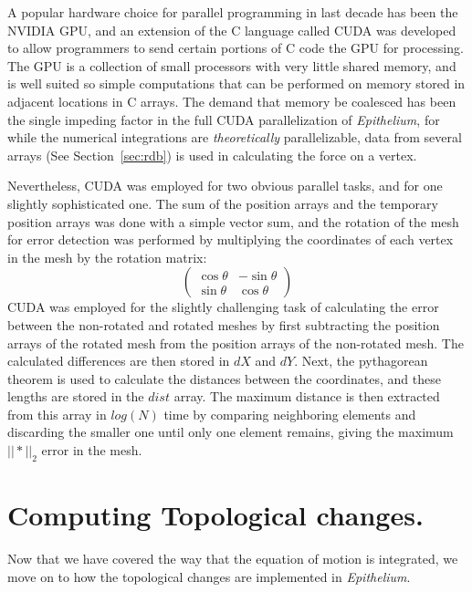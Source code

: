 A popular hardware choice for parallel programming in last decade has been the NVIDIA GPU, and an extension of the C language called CUDA was developed to allow programmers to send certain portions of C code the GPU for processing. The GPU is a collection of small processors with very little shared memory, and is well suited so simple computations that can be performed on memory stored in adjacent locations in C arrays. The demand that memory be coalesced has been the single impeding factor in the full CUDA parallelization of \emph{Epithelium}, for while the numerical integrations are \emph{theoretically} parallelizable, data from several arrays (See Section~\ref{sec:rdb}) is used in calculating the force on a vertex.

Nevertheless, CUDA was employed for two obvious parallel tasks, and for one slightly sophisticated one. The sum of the position arrays and the temporary position arrays was done with a simple vector sum, and the rotation of the mesh for error detection was performed by multiplying the coordinates of each vertex in the mesh by the rotation matrix:
\[ \left( \begin{array}{cc}
\cos\theta & -\sin\theta \\
\sin\theta & \cos\theta 
\end{array} \right)\] 
CUDA was employed for the slightly challenging task of calculating the error between the non-rotated and rotated meshes by first subtracting the position arrays of the rotated mesh from the position arrays of the non-rotated mesh. The calculated differences are then stored in $dX$ and $dY$. Next, the pythagorean theorem is used to calculate the distances between the coordinates, and these lengths are stored in the $dist$ array. The maximum distance is then extracted from this array in $log(N)$ time by comparing neighboring elements and discarding the smaller one until only one element remains, giving the maximum $||*||_2$ error in the mesh.

\section{Computing Topological changes.}
Now that we have covered the way that the equation of motion is integrated, we move on to how the topological changes are implemented in \emph{Epithelium}.  

